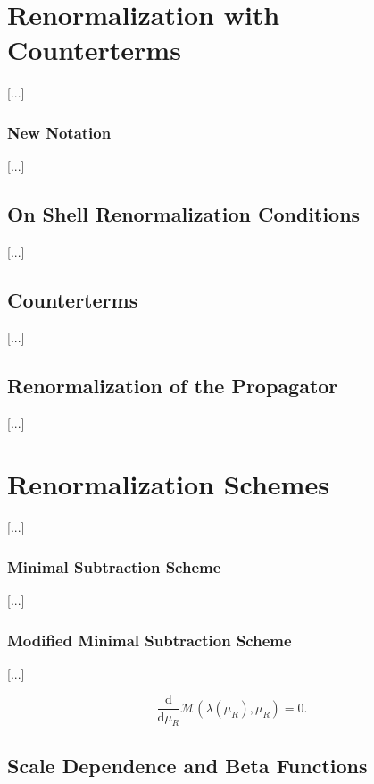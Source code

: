 \section{Renormalization with Counterterms}

 [...]

\subsubsection{New Notation}

[...]

\subsection{On Shell Renormalization Conditions}

[...]

\subsection{Counterterms}

[...]

\subsection{Renormalization of the Propagator}

[...]

\section{Renormalization Schemes}

 [...]

\subsubsection{Minimal Subtraction Scheme}

[...]

\subsubsection{Modified Minimal Subtraction Scheme}

[...]

\[
    \frac{\mathrm{d}}{\mathrm{d} \mu_R} \mathcal{M} (\lambda(\mu_R), \mu_R) = 0.
\]

\subsection{Scale Dependence and Beta Functions}


